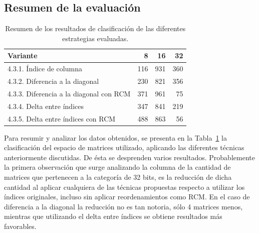 \subsection{Resumen de la evaluación}

\begin{table}[h]
\centering
\begin{tabular}{|l||r|r|r|}
\hline
         Variante                              & 8   & 16  & 32  \\ \hline\hline
4.3.1. Índice de columna                & 116 & 931 & 360 \\ \hline
4.3.2. Diferencia a la diagonal        & 230 & 821 & 356 \\ \hline
4.3.3. Diferencia a la diagonal con RCM & 371 & 961 & 75  \\ \hline
4.3.4. Delta entre índices              & 347 & 841 & 219 \\ \hline
4.3.5. Delta entre índices con RCM      & 488 & 863 & 56  \\ \hline
\end{tabular}
\caption{Resumen de los resultados de clasificación de las diferentes estrategias evaluadas.}
\label{tab:resumen-resultados}
\end{table}

Para resumir y analizar los datos obtenidos, se presenta en la Tabla~\ref{tab:resumen-resultados} la clasificación del espacio de matrices utilizado, aplicando las diferentes técnicas anteriormente discutidas. 
De ésta se desprenden varios resultados. Probablemente la primera observación que surge analizando la columna de la cantidad de matrices que pertenecen a la categoría de 32 bits, es la reducción de dicha cantidad al aplicar cualquiera de las técnicas propuestas respecto a utilizar los índices originales, incluso sin aplicar reordenamientos como RCM. En el caso de diferencia a la diagonal la reducción no es tan notoria, sólo 4 matrices menos, mientras que utilizando el delta entre índices se obtiene resultados más favorables.

